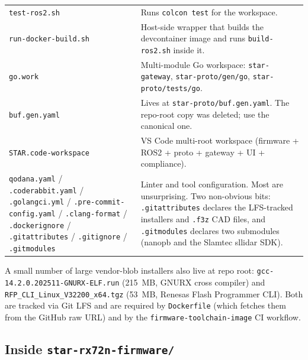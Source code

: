 \begin{center}
\begin{tabular}{|p{4.0cm}|p{10.5cm}|}
\texttt{test-ros2.sh}                  & Runs \texttt{colcon test} for the workspace.                                                                                                    \\
\texttt{run-docker-build.sh}           & Host-side wrapper that builds the devcontainer image and runs \texttt{build-ros2.sh} inside it.                                                  \\
\texttt{go.work}                       & Multi-module Go workspace: \texttt{star-gateway}, \texttt{star-proto/gen/go}, \texttt{star-proto/tests/go}.                                       \\
\texttt{buf.gen.yaml}                  & Lives at \texttt{star-proto/buf.gen.yaml}. The repo-root copy was deleted; use the canonical one.                                                \\
\texttt{STAR.code-workspace}           & VS Code multi-root workspace (firmware + ROS2 + proto + gateway + UI + compliance).                                                              \\
\texttt{qodana.yaml} / \texttt{.coderabbit.yaml} / \texttt{.golangci.yml} / \texttt{.pre-commit-config.yaml} / \texttt{.clang-format} / \texttt{.dockerignore} / \texttt{.gitattributes} / \texttt{.gitignore} / \texttt{.gitmodules} & Linter and tool configuration. Most are unsurprising. Two non-obvious bits: \texttt{.gitattributes} declares the LFS-tracked installers and \texttt{.f3z} CAD files, and \texttt{.gitmodules} declares two submodules (nanopb and the Slamtec sllidar SDK). \\
\hline
\end{tabular}
\end{center}

A small number of large vendor-blob installers also live at repo root:
\texttt{gcc-14.2.0.202511-GNURX-ELF.run} (215~MB, GNURX cross compiler)
and \texttt{RFP\_CLI\_Linux\_V32200\_x64.tgz} (53~MB, Renesas Flash
Programmer CLI). Both are tracked via Git LFS and are required by
\texttt{Dockerfile} (which fetches them from the GitHub raw URL) and by
the \texttt{firmware-toolchain-image} CI workflow.

\subsection{Inside \texttt{star-rx72n-firmware/}}


